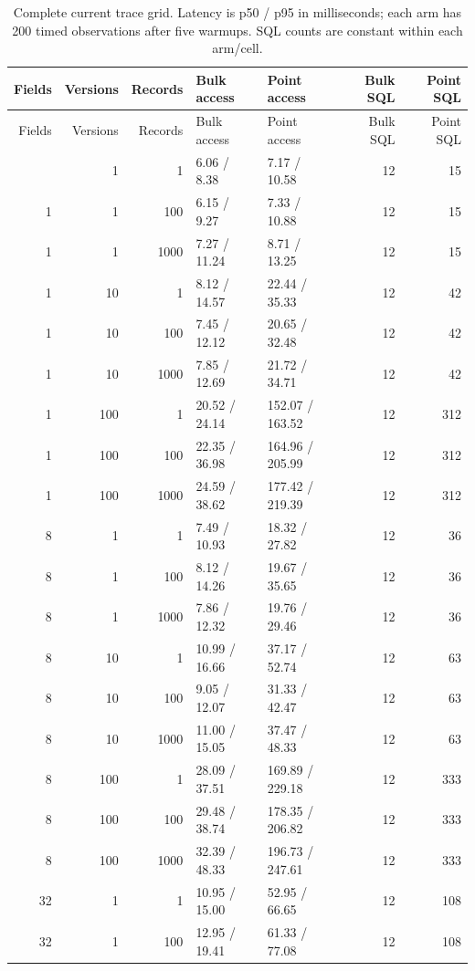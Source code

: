 \begingroup
\small
\setlength{\tabcolsep}{3pt}
\begin{longtable}{@{}rrrllrr@{}}
\caption{Complete current trace grid. Latency is p50 / p95 in milliseconds; each arm has 200 timed observations after five warmups. SQL counts are constant within each arm/cell.}\label{tab:s-trace-grid}\\
\toprule
Fields & Versions & Records & Bulk access & Point access & Bulk SQL & Point SQL \\
\midrule
\endfirsthead
\toprule
Fields & Versions & Records & Bulk access & Point access & Bulk SQL & Point SQL \\
\midrule
\endhead
\bottomrule
\endfoot
1 & 1 & 1 & 6.06 / 8.38 & 7.17 / 10.58 & 12 & 15 \\
1 & 1 & 100 & 6.15 / 9.27 & 7.33 / 10.88 & 12 & 15 \\
1 & 1 & 1000 & 7.27 / 11.24 & 8.71 / 13.25 & 12 & 15 \\
1 & 10 & 1 & 8.12 / 14.57 & 22.44 / 35.33 & 12 & 42 \\
1 & 10 & 100 & 7.45 / 12.12 & 20.65 / 32.48 & 12 & 42 \\
1 & 10 & 1000 & 7.85 / 12.69 & 21.72 / 34.71 & 12 & 42 \\
1 & 100 & 1 & 20.52 / 24.14 & 152.07 / 163.52 & 12 & 312 \\
1 & 100 & 100 & 22.35 / 36.98 & 164.96 / 205.99 & 12 & 312 \\
1 & 100 & 1000 & 24.59 / 38.62 & 177.42 / 219.39 & 12 & 312 \\
8 & 1 & 1 & 7.49 / 10.93 & 18.32 / 27.82 & 12 & 36 \\
8 & 1 & 100 & 8.12 / 14.26 & 19.67 / 35.65 & 12 & 36 \\
8 & 1 & 1000 & 7.86 / 12.32 & 19.76 / 29.46 & 12 & 36 \\
8 & 10 & 1 & 10.99 / 16.66 & 37.17 / 52.74 & 12 & 63 \\
8 & 10 & 100 & 9.05 / 12.07 & 31.33 / 42.47 & 12 & 63 \\
8 & 10 & 1000 & 11.00 / 15.05 & 37.47 / 48.33 & 12 & 63 \\
8 & 100 & 1 & 28.09 / 37.51 & 169.89 / 229.18 & 12 & 333 \\
8 & 100 & 100 & 29.48 / 38.74 & 178.35 / 206.82 & 12 & 333 \\
8 & 100 & 1000 & 32.39 / 48.33 & 196.73 / 247.61 & 12 & 333 \\
32 & 1 & 1 & 10.95 / 15.00 & 52.95 / 66.65 & 12 & 108 \\
32 & 1 & 100 & 12.95 / 19.41 & 61.33 / 77.08 & 12 & 108 \\

\end{longtable}
